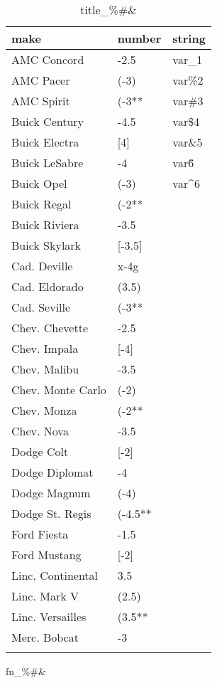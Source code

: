 \documentclass{article}
\begin{document}
\begin{table}[tbp] \centering
{}

\caption{title\_\%\#\&}
\begin{tabularx}{\linewidth}{lCC}

\toprule
{make}&{number}&{string} \tabularnewline
\midrule \addlinespace[\belowrulesep]
AMC Concord&-2.5&var\_1 \tabularnewline
AMC Pacer&(-3)&var\%2 \tabularnewline
AMC Spirit&(-3**&var\#3 \tabularnewline
Buick Century&-4.5&var\$4 \tabularnewline
Buick Electra&[4]&var\&5 \tabularnewline
Buick LeSabre&-4&var\~6 \tabularnewline
Buick Opel&(-3)&var\^{}6 \tabularnewline
Buick Regal&(-2**& \tabularnewline
Buick Riviera&-3.5& \tabularnewline
Buick Skylark&[-3.5]& \tabularnewline
Cad. Deville&x-4g& \tabularnewline
Cad. Eldorado&(3.5)& \tabularnewline
Cad. Seville&(-3**& \tabularnewline
Chev. Chevette&-2.5& \tabularnewline
Chev. Impala&[-4]& \tabularnewline
Chev. Malibu&-3.5& \tabularnewline
Chev. Monte Carlo&(-2)& \tabularnewline
Chev. Monza&(-2**& \tabularnewline
Chev. Nova&-3.5& \tabularnewline
Dodge Colt&[-2]& \tabularnewline
Dodge Diplomat&-4& \tabularnewline
Dodge Magnum&(-4)& \tabularnewline
Dodge St. Regis&(-4.5**& \tabularnewline
Ford Fiesta&-1.5& \tabularnewline
Ford Mustang&[-2]& \tabularnewline
Linc. Continental&3.5& \tabularnewline
Linc. Mark V&(2.5)& \tabularnewline
Linc. Versailles&(3.5**& \tabularnewline
Merc. Bobcat&-3& \tabularnewline
\bottomrule \addlinespace[\belowrulesep]

\end{tabularx}
\begin{flushleft}
\footnotesize fn\_\%\#\&
\end{flushleft}
\end{table}
\end{document}

